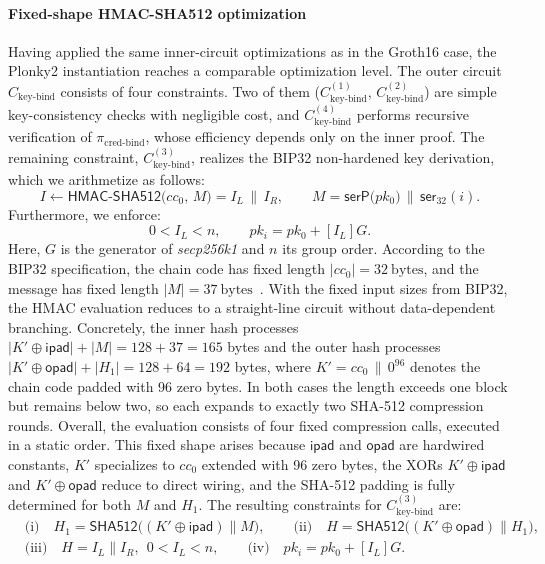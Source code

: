 \paragraph{Fixed-shape HMAC-SHA512 optimization}
Having applied the same inner-circuit optimizations as in the Groth16 case, the Plonky2 instantiation reaches a comparable optimization level. The outer circuit $C_{\text{key-bind}}$ consists of four constraints. Two of them ($C_{\text{key-bind}}^{(1)}$, $C_{\text{key-bind}}^{(2)}$) are simple key-consistency checks with negligible cost, and $C_{\text{key-bind}}^{(4)}$ performs recursive verification of $\pi_{\text{cred-bind}}$, whose efficiency depends only on the inner proof. The remaining constraint, $C_{\text{key-bind}}^{(3)}$, realizes the BIP32 non-hardened key derivation, which we arithmetize as follows:
\[
I \gets \mathsf{HMAC\mbox{-}SHA512}\bigl(cc_0,\, M\bigr) = I_L \,\|\, I_R,\qquad 
M = \mathsf{serP}\bigl(pk_0\bigr)\,\|\, \mathsf{ser}_{32}(i).
\]
Furthermore, we enforce:
\[
0 < I_L < n,\qquad pk_i = pk_0 + [I_L]G.
\]
Here, $G$ is the generator of \emph{secp256k1} and $n$ its group order. According to the BIP32 specification, the chain code has fixed length $|cc_0| = 32\ \text{bytes}$, and the message has fixed length $|M| = 37\ \text{bytes}$~\cite{bip32}. With the fixed input sizes from BIP32, the HMAC evaluation reduces to a straight-line circuit without data-dependent branching. Concretely, the inner hash processes $|K'\oplus \mathsf{ipad}|+|M|=128+37=165$ bytes and the outer hash processes $|K'\oplus \mathsf{opad}|+|H_1|=128+64=192$ bytes, where $K' = cc_0 \,\|\, 0^{96}$ denotes the chain code padded with 96 zero bytes. In both cases the length exceeds one block but remains below two, so each expands to exactly two SHA-512 compression rounds. Overall, the evaluation consists of four fixed compression calls, executed in a static order. This fixed shape arises because $\mathsf{ipad}$ and $\mathsf{opad}$ are hardwired constants, $K'$ specializes to $cc_0$ extended with 96 zero bytes, the XORs $K'\oplus\mathsf{ipad}$ and $K'\oplus\mathsf{opad}$ reduce to direct wiring, and the SHA-512 padding is fully determined for both $M$ and $H_1$. The resulting constraints for $C_{\text{key-bind}}^{(3)}$ are:
\[
\begin{aligned}
	&\text{(i)}\quad H_1=\mathsf{SHA512}\bigl((K'\oplus\mathsf{ipad})\|M\bigr),\qquad
	\text{(ii)}\quad H=\mathsf{SHA512}\bigl((K'\oplus\mathsf{opad})\|H_1\bigr),\\
	&\text{(iii)}\quad H=I_L\|I_R,\ \ 0<I_L<n,\qquad
	\text{(iv)}\quad pk_i = pk_0 + [I_L]G.
\end{aligned}
\]

